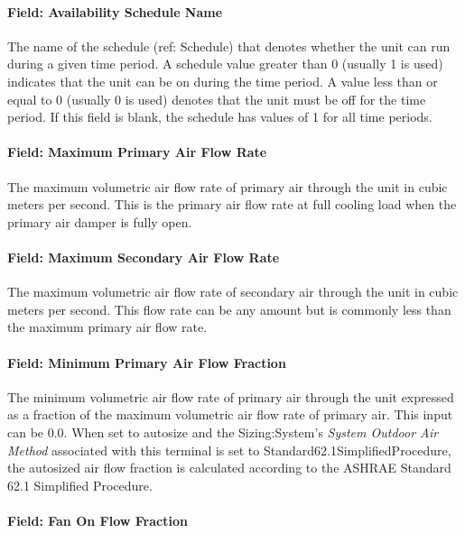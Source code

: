\paragraph{Field: Availability Schedule Name}\label{field-availability-schedule-name-8}

The name of the schedule (ref: Schedule) that denotes whether the unit can run during a given time period. A schedule value greater than 0 (usually 1 is used) indicates that the unit can be on during the time period. A value less than or equal to 0 (usually 0 is used) denotes that the unit must be off for the time period. If this field is blank, the schedule has values of 1 for all time periods.

\paragraph{Field: Maximum Primary Air Flow Rate}\label{field-maximum-primary-air-flow-rate-1}

The maximum volumetric air flow rate of primary air through the unit in cubic meters per second. This is the primary air flow rate at full cooling load when the primary air damper is fully open.

\paragraph{Field: Maximum Secondary Air Flow Rate}\label{field-maximum-secondary-air-flow-rate}

The maximum volumetric air flow rate of secondary air through the unit in cubic meters per second. This flow rate can be any amount but is commonly less than the maximum primary air flow rate.

\paragraph{Field: Minimum Primary Air Flow Fraction}\label{field-minimum-primary-air-flow-fraction-1}

The minimum volumetric air flow rate of primary air through the unit expressed as a fraction of the maximum volumetric air flow rate of primary air. This input can be 0.0. When set to autosize and the Sizing:System's \emph{System Outdoor Air Method} associated with this terminal is set to Standard62.1SimplifiedProcedure, the autosized air flow fraction is calculated according to the ASHRAE Standard 62.1 Simplified Procedure.

\paragraph{Field: Fan On Flow Fraction}\label{field-fan-on-flow-fraction}

